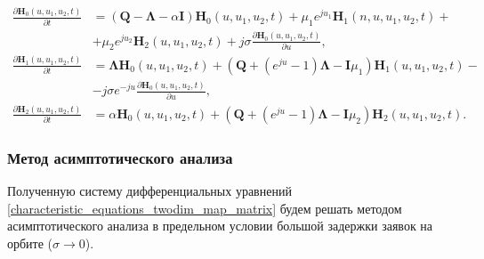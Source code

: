 \begin{equation} \label{characteristic_equations_twodim_map_matrix}
	\begin{split}
		\frac{{\partial \boldsymbol{H}_{0}(u,u_{1},u_{2},t)}}{{\partial t}} &= (\boldsymbol{Q}-\boldsymbol{\Lambda}-\alpha\boldsymbol{I})\boldsymbol{H}_{0}(u,u_{1},u_{2},t) + \mu_{1} e^{ju_{1}}\boldsymbol{H}_{1}(n,u,u_{1},u_{2},t)  + \\  &+ \mu_{2}e^{ju_{2}}\boldsymbol{H}_{2}(u,u_{1},u_{2},t) + j\sigma
		\frac{{\partial \boldsymbol{H}_{0}(u,u_{1},u_{2},t)}}{{\partial u}},
		\\
		\frac{{\partial \boldsymbol{H}_{1}(u,u_{1},u_{2},t)}}{{\partial t}} &= \boldsymbol{\Lambda} \boldsymbol{H}_{0}(u,u_{1},u_{2},t) +  (\boldsymbol{Q}+(e^{ju}-1)\boldsymbol{\Lambda} - \boldsymbol{I}\mu_{1})\boldsymbol{H}_{1}(u,u_{1},u_{2},t) -\\ &- j\sigma e^{-ju}
		\frac{{\partial \boldsymbol{H}_{0}(u,u_{1},u_{2},t)}}{{\partial u}},
		\\
		\frac{{\partial \boldsymbol{H}_{2}(u,u_{1},u_{2},t)}}{{\partial t}} &= \alpha \boldsymbol{H}_{0}(u,u_{1},u_{2},t) + (\boldsymbol{Q}+(e^{ju}-1)\boldsymbol{\Lambda} - \boldsymbol{I}\mu_{2})\boldsymbol{H}_{2}(u,u_{1},u_{2},t).
	\end{split}
\end{equation} 
\subsubsection{Метод асимптотического анализа}
Полученную систему дифференциальных уравнений \eqref{characteristic_equations_twodim_map_matrix} будем решать методом асимптотического анализа в предельном условии большой задержки заявок на орбите ($\sigma \xrightarrow{} 0$).

